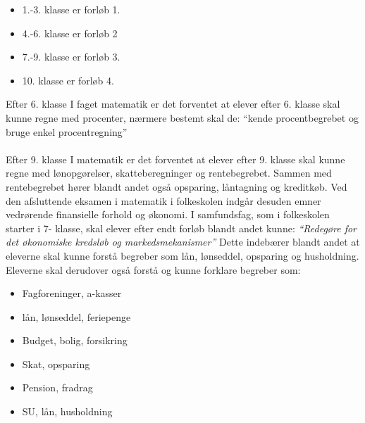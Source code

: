 \noindent \begin{itemize}
\item{1.-3. klasse er forløb 1.}
\item{4.-6. klasse er forløb 2}
\item{7.-9. klasse er forløb 3.}
\item{10. klasse er forløb 4.}\\
\end{itemize}

Efter 6. klasse
I faget matematik er det forventet at elever efter 6. klasse skal kunne regne med procenter,
nærmere bestemt skal de: “kende procentbegrebet og bruge enkel procentregning” \cite{FallesMalMatematik}\\
\\
Efter 9. klasse
I matematik er det forventet at elever efter 9. klasse skal kunne regne med lønopgørelser, skatteberegninger og rentebegrebet.  Sammen med rentebegrebet hører blandt andet også opsparing, låntagning og kreditkøb.
Ved den afsluttende eksamen i matematik i folkeskolen indgår desuden emner vedrørende finansielle forhold og økonomi.
I samfundsfag, som i folkeskolen starter i 7- klasse, skal elever efter endt forløb blandt andet kunne: \textit{“Redegøre for det økonomiske kredsløb og markedsmekanismer”} \cite{FallesMalSamfundsfag}
Dette indebærer blandt andet at eleverne skal kunne forstå begreber som lån, lønseddel, opsparing og husholdning.
Eleverne skal derudover også forstå og kunne forklare begreber som: 

\noindent \begin{itemize}
\item{Fagforeninger, a-kasser}
\item{lån, lønseddel, feriepenge}
\item{Budget, bolig, forsikring}
\item{Skat, opsparing}
\item{Pension, fradrag}
\item{SU, lån, husholdning}
\cite{FallesMalMatematik}\\
\end{itemize}

